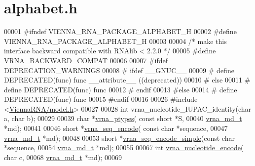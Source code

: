 \hypertarget{alphabet_8h_source}{}\section{alphabet.\+h}
\label{alphabet_8h_source}

\begin{DoxyCode}
00001 \textcolor{preprocessor}{#ifndef VIENNA\_RNA\_PACKAGE\_ALPHABET\_H}
00002 \textcolor{preprocessor}{#define VIENNA\_RNA\_PACKAGE\_ALPHABET\_H}
00003 
00004 \textcolor{comment}{/* make this interface backward compatible with RNAlib < 2.2.0 */}
00005 \textcolor{preprocessor}{#define VRNA\_BACKWARD\_COMPAT}
00006 
00007 \textcolor{preprocessor}{#ifdef DEPRECATION\_WARNINGS}
00008 \textcolor{preprocessor}{# ifdef \_\_GNUC\_\_}
00009 \textcolor{preprocessor}{#  define DEPRECATED(func) func \_\_attribute\_\_ ((deprecated))}
00010 \textcolor{preprocessor}{# else}
00011 \textcolor{preprocessor}{#  define DEPRECATED(func) func}
00012 \textcolor{preprocessor}{# endif}
00013 \textcolor{preprocessor}{#else}
00014 \textcolor{preprocessor}{# define DEPRECATED(func) func}
00015 \textcolor{preprocessor}{#endif}
00016 
00026 \textcolor{preprocessor}{#include <\hyperlink{model_8h}{ViennaRNA/model.h}>}
00027 
00028 \textcolor{keywordtype}{int} vrna\_nucleotide\_IUPAC\_identity(\textcolor{keywordtype}{char} a, \textcolor{keywordtype}{char} b);
00029 
00039 \textcolor{keywordtype}{char}  *\hyperlink{alphabet_8h_a51a9e86a5f731f5f2f5584ee67cee4a8}{vrna\_ptypes}( \textcolor{keyword}{const} \textcolor{keywordtype}{short} *S,
00040                     \hyperlink{group__model__details_structvrna__md__s}{vrna\_md\_t} *md);
00041 
00046 \textcolor{keywordtype}{short} *\hyperlink{alphabet_8h_a636e7d6f888fd639587296a5eddea660}{vrna\_seq\_encode}( \textcolor{keyword}{const} \textcolor{keywordtype}{char} *sequence,
00047                         \hyperlink{group__model__details_structvrna__md__s}{vrna\_md\_t} *md);
00048 
00053 \textcolor{keywordtype}{short} *\hyperlink{alphabet_8h_a3cd79d21d53248ad2634c1c0d43e97d7}{vrna\_seq\_encode\_simple}(\textcolor{keyword}{const} \textcolor{keywordtype}{char} *sequence,
00054                               \hyperlink{group__model__details_structvrna__md__s}{vrna\_md\_t} *md);
00055 
00067 \textcolor{keywordtype}{int} \hyperlink{alphabet_8h_ac12bf00123f88621c9be847b0879c1fb}{vrna\_nucleotide\_encode}( \textcolor{keywordtype}{char} c,
00068                             \hyperlink{group__model__details_structvrna__md__s}{vrna\_md\_t} *md);
00069 

\end{DoxyCode}
